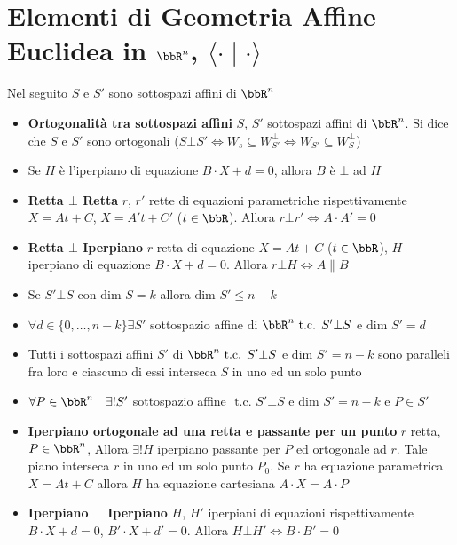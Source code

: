 \documentclass[a4paper,NoNotes]{stdmdoc}
\newcommand{\tc}{\mbox{ t.c. }}
\newcommand{\Dim}{\mbox{dim }}
\newcommand{\scal}[2]{\langle #1 \mid #2 \rangle}
\newcommand{\sse}{\Leftrightarrow}
\begin{document}
	\section*{Elementi di Geometria Affine Euclidea in $\bbR^n$, $\scal{\cdot}{\cdot}$}
	Nel seguito $S$ e $S'$ sono sottospazi affini di $\bbR^n$
	\begin{itemize}
		\item {\bf Ortogonalità tra sottospazi affini} $S$, $S'$ sottospazi affini di $\bbR^n$. Si dice che $S$ e $S'$ sono ortogonali ($S \bot S' \sse W_s \subseteq W_{S'}^\bot \sse W_{S'} \subseteq W_{S}^\bot$)
		\item Se $H$ è l'iperpiano di equazione $B\cdot X + d = 0$, allora $B$ è $\bot$ ad $H$		
		\item {\bf Retta $\bm\bot$ Retta} $r$, $r'$ rette di equazioni parametriche rispettivamente $X=At+C$, $X=A't+C'$ ($t \in \bbR$). Allora $r \bot r' \sse A\cdot A' = 0$
		\item {\bf Retta $\bm\bot$ Iperpiano} $r$ retta di equazione $X=At+C$ ($t \in \bbR$), $H$ iperpiano di equazione $B \cdot X + d = 0$. Allora $r \bot H \sse A \parallel B$
		\item Se $S' \bot S$ con $\Dim S = k$ allora $\Dim S' \le n-k$
		\item $\forall d \in \{0, \ldots, n-k\} \exists S'$ sottospazio affine di $\bbR^n \tc S' \bot S$ e $\Dim S' = d$
		\item Tutti i sottospazi affini $S'$ di $\bbR^n \tc S' \bot S$ e $\Dim S' = n-k$ sono paralleli fra loro e ciascuno di essi interseca $S$ in uno ed un solo punto
		\item $\forall P \in \bbR^n \quad \exists ! S'$ sottospazio affine $\tc S' \bot S$ e $\Dim S' = n-k$ e $P \in S'$
		\item {\bf Iperpiano ortogonale ad una retta e passante per un punto} $r$ retta, $P \in \bbR^n$, Allora $\exists ! H$ iperpiano passante per $P$ ed ortogonale ad $r$. Tale piano interseca $r$ in uno ed un solo punto $P_0$. Se $r$ ha equazione parametrica $X = At+C$ allora $H$ ha equazione cartesiana $A\cdot X = A \cdot P$
		\item {\bf Iperpiano $\bm\bot$ Iperpiano} $H$, $H'$ iperpiani di equazioni rispettivamente $B \cdot X + d = 0$, $B' \cdot X + d' = 0$. Allora $H \bot H' \sse B \cdot B' = 0$
	\end{itemize}
\end{document}
